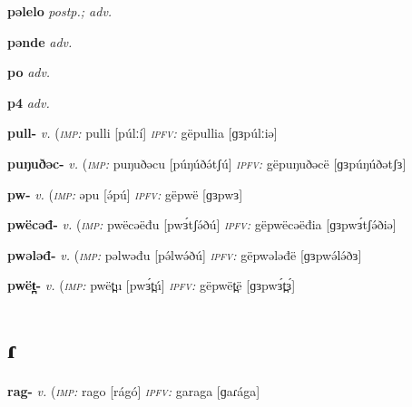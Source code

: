 {\newentry
\headword\textbf{pəlelo}  
\ipa{[pə́léló]}
\synpos\textit{postp.; adv.} 

\newentry
\headword\textbf{pənde}  
\ipa{[pə́ndé]}
\synpos\textit{adv.} 

\newentry
\headword\textbf{po}  
\ipa{[po]}
\synpos\textit{adv.} 

\newentry
\headword\textbf{p4}  
\ipa{[p4]}
\synpos\textit{adv.} 

\newentry
\headword\textbf{pull-}  
\ipa{[púlː-]}
\synpos\textit{v.} 
\imperative(\textit {\textsc{imp:}} pulli [púlːí]
\imperfective\textit{\textsc{ipfv:}} gëpullia [ɡɜpúlːiə]

\newentry
\headword\textbf{puŋuðəc-}  
\ipa{[púŋúðətʃ-]}
\synpos\textit{v.} 
\imperative(\textit {\textsc{imp:}} puŋuðəcu [púŋúðə́tʃú]
\imperfective\textit{\textsc{ipfv:}} gëpuŋuðəcë [ɡɜpúŋúðətʃɜ]

\newentry
\headword\textbf{pw-}  
\ipa{[pw-]}
\synpos\textit{v.} 
\imperative(\textit {\textsc{imp:}} əpu [ə́pú]
\imperfective\textit{\textsc{ipfv:}} gëpwë [ɡɜpwɜ]

\newentry
\headword\textbf{pwëcəđ-}  
\synpos\textit{v.} 
\imperative(\textit {\textsc{imp:}} pwëcəëđu [pwɜ́tʃə́ðú]
\imperfective\textit{\textsc{ipfv:}} gëpwëcəëđia [ɡɜpwɜ́tʃə́ðiə]

\newentry
\headword\textbf{pwələđ-}  
\ipa{[pwɘ́lɘ́ð-]}
\synpos\textit{v.} 
\imperative(\textit {\textsc{imp:}} pəlwəđu [pə́lwə́ðú] %
\imperfective\textit{\textsc{ipfv:}} gëpwələđë [ɡɜpwə́lə́ðɜ]

\newentry
\headword\textbf{pwët̪-}  
\ipa{[pwɜ́t̪-]}
\synpos\textit{v.} 
\imperative(\textit {\textsc{imp:}} pwët̪u [pwɜ́t̪ú]
\imperfective\textit{\textsc{ipfv:}} gëpwët̪ë [ɡɜpwɜ́t̪ɜ́]

\section*{ɾ}\label{ɾ}

\newentry
\headword\textbf{rag-}  
\ipa{[ɾág-]}
\synpos\textit{v.} 
\imperative(\textit {\textsc{imp:}} rago [rágó]
\imperfective\textit{\textsc{ipfv:}} garaga [ɡaɾága]


}
